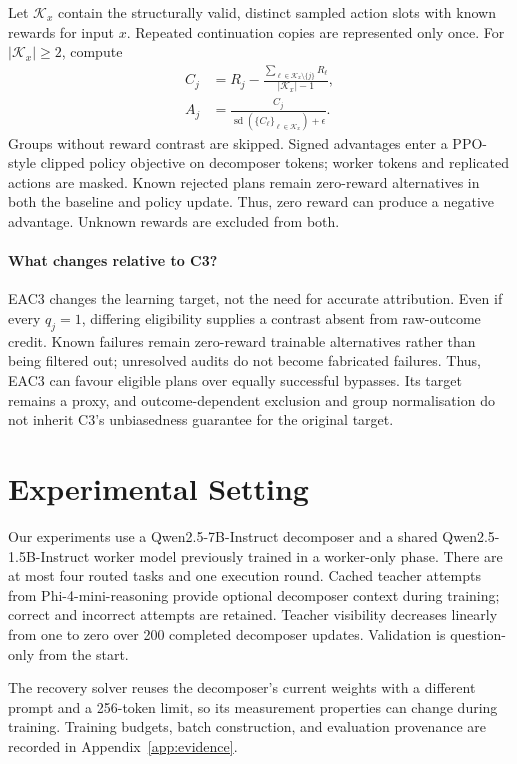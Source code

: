 \documentclass[11pt]{article}
\begin{document}
Let $\mathcal K_x$ contain the structurally valid, distinct sampled action slots with known rewards for input $x$. Repeated continuation copies are represented only once. For $|\mathcal K_x|\geq2$, compute
\begin{align}
C_j&=R_j-\frac{\sum_{\ell\in\mathcal K_x\setminus\{j\}}R_\ell}{|\mathcal K_x|-1},\\
A_j&=\frac{C_j}{\operatorname{sd}(\{C_\ell\}_{\ell\in\mathcal K_x})+\epsilon}.
\end{align}
Groups without reward contrast are skipped. Signed advantages enter a PPO-style clipped policy objective on decomposer tokens; worker tokens and replicated actions are masked. Known rejected plans remain zero-reward alternatives in both the baseline and policy update. Thus, zero reward can produce a negative advantage. Unknown rewards are excluded from both.

\paragraph{What changes relative to C3?}
EAC3 changes the learning target, not the need for accurate attribution. Even if every $q_j=1$, differing eligibility supplies a contrast absent from raw-outcome credit. Known failures remain zero-reward trainable alternatives rather than being filtered out; unresolved audits do not become fabricated failures. Thus, EAC3 can favour eligible plans over equally successful bypasses. Its target remains a proxy, and outcome-dependent exclusion and group normalisation do not inherit C3's unbiasedness guarantee for the original target.

\section{Experimental Setting}
Our experiments use a Qwen2.5-7B-Instruct decomposer and a shared Qwen2.5-1.5B-Instruct worker model previously trained in a worker-only phase. There are at most four routed tasks and one execution round. Cached teacher attempts from Phi-4-mini-reasoning provide optional decomposer context during training; correct and incorrect attempts are retained. Teacher visibility decreases linearly from one to zero over 200 completed decomposer updates. Validation is question-only from the start.

The recovery solver reuses the decomposer's current weights with a different prompt and a 256-token limit, so its measurement properties can change during training. Training budgets, batch construction, and evaluation provenance are recorded in Appendix~\ref{app:evidence}.
\end{document}
